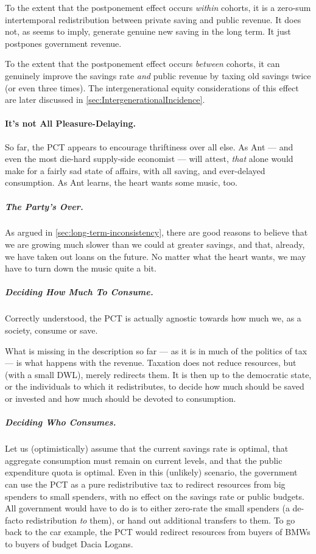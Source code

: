 \begin{description}
	To the extent that the postponement effect occurs \emph{within} cohorts, it is a zero-sum intertemporal redistribution between private saving and public revenue.
	It does not, as \citeauthor{Seidman1997} seems to imply, generate genuine new saving in the long term.
	It just postpones government revenue.

	To the extent that the postponement effect occurs \emph{between} cohorts, it can genuinely improve the savings rate \emph{and} public revenue by taxing old savings twice (or even three times).
	The intergenerational equity considerations of this effect are later discussed in \autoref{sec:IntergenerationalIncidence}.
\end{description}

\paragraph{It's not All Pleasure-Delaying.}
So far, the PCT appears to encourage thriftiness over all else.
As Ant --- and even the most die-hard supply-side economist --- will attest, \emph{that} alone would make for a fairly sad state of affairs, with all saving, and ever-delayed consumption.
As Ant learns, the heart wants some music, too.

\subparagraph{The Party's Over.}
As argued in \autoref{sec:long-term-inconsistency}, there are good reasons to believe that we are growing much slower than we could at greater savings, and that, already, we have taken out loans on the future.
No matter what the heart wants, we may have to turn down the music quite a bit.

\subparagraph{Deciding How Much To Consume.}
Correctly understood, the PCT is actually agnostic towards how much we, as a society, consume or save.

What is missing in the description so far --- as it is in much of the politics of tax --- is what happens with the revenue.
Taxation does not reduce resources, but (with a small DWL), merely redirects them.
It is then up to the democratic state, or the individuals to which it redistributes, to decide how much should be saved or invested and how much should be devoted to consumption.

\subparagraph{Deciding Who Consumes.}
Let us (optimistically) assume that the current savings rate is optimal, that aggregate consumption must remain on current levels, and that the public expenditure quota is optimal.
Even in this (unlikely) scenario, the government can use the PCT as a pure redistributive tax to redirect resources from big spenders to small spenders, with no effect on the savings rate or public budgets.
All government would have to do is to either zero-rate the small spenders (a de-facto redistribution \emph{to} them), or hand out additional transfers to them.
To go back to the car example, the PCT would redirect resources from buyers of BMWs to buyers of budget Dacia Logans.

